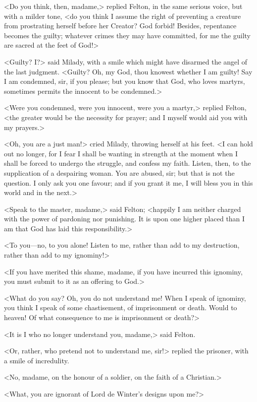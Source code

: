 <Do you think, then, madame,> replied Felton, in the same serious voice, but with a milder tone, <do you think I assume the right of preventing a creature from prostrating herself before her Creator? God forbid! Besides, repentance becomes the guilty; whatever crimes they may have committed, for me the guilty are sacred at the feet of God!> 

<Guilty? I?> said Milady, with a smile which might have disarmed the angel of the last judgment. <Guilty? Oh, my God, thou knowest whether I am guilty! Say I am condemned, sir, if you please; but you know that God, who loves martyrs, sometimes permits the innocent to be condemned.> 

<Were you condemned, were you innocent, were you a martyr,> replied Felton, <the greater would be the necessity for prayer; and I myself would aid you with my prayers.> 

<Oh, you are a just man!> cried Milady, throwing herself at his feet. <I can hold out no longer, for I fear I shall be wanting in strength at the moment when I shall be forced to undergo the struggle, and confess my faith. Listen, then, to the supplication of a despairing woman. You are abused, sir; but that is not the question. I only ask you one favour; and if you grant it me, I will bless you in this world and in the next.> 

<Speak to the master, madame,> said Felton; <happily I am neither charged with the power of pardoning nor punishing. It is upon one higher placed than I am that God has laid this responsibility.> 

<To you---no, to you alone! Listen to me, rather than add to my destruction, rather than add to my ignominy!> 

<If you have merited this shame, madame, if you have incurred this ignominy, you must submit to it as an offering to God.> 

<What do you say? Oh, you do not understand me! When I speak of ignominy, you think I speak of some chastisement, of imprisonment or death. Would to heaven! Of what consequence to me is imprisonment or death?> 

<It is I who no longer understand you, madame,> said Felton. 

<Or, rather, who pretend not to understand me, sir!> replied the prisoner, with a smile of incredulity. 

<No, madame, on the honour of a soldier, on the faith of a Christian.> 

<What, you are ignorant of Lord de Winter's designs upon me?> 

